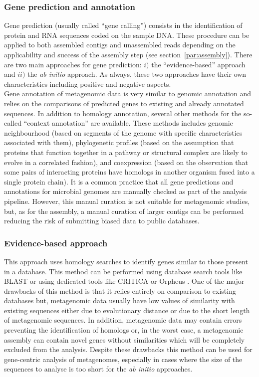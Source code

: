 \subsubsection{Gene prediction and annotation}
Gene prediction (usually called ``gene calling'') consists in the identification of protein and RNA sequences coded on the sample DNA. These procedure can be applied to both assembled contigs and unassembled reads depending on the applicability and success of the assembly step (see section~\ref{par:assembly}). There are two main approaches for gene prediction: $i)$ the ``evidence-based'' approach and $ii)$ the \textit{ab initio} approach. As always, these two approaches have their own characteristics including positive and negative aspects.\\
Gene annotation of metagenomic data is very similar to genomic annotation and relies on the comparisons of predicted genes to existing and already annotated sequences. In addition to homology annotation, several other methods for the so-called ``context annotation'' are available. These methods includes genomic neighbourhood \cite{dandekar1998conservation} (based on segments of the genome with specific characteristics associated with them), phylogenetic profiles \cite{pellegrini1999assigning} (based on the assumption that proteins that function together in a pathway or structural complex are likely to evolve in a correlated fashion), and coexpression \cite{marcotte1999detecting} (based on the observation that some pairs of interacting proteins have homologs in another organism fused into a single protein chain). It is a common practice that all gene predictions and annotations   for microbial genomes are manually checked as part of the analysis pipeline. However, this manual curation is not suitable for metagenomic studies, but, as for the assembly, a manual curation of larger contigs can be performed reducing the risk of submitting biased data to public databases.\\

\subsubsection*{Evidence-based approach}
This approach uses homology searches to identify genes similar to those present in a database. This method can be performed using database search tools like BLAST \cite{altschul1990basic} or using dedicated tools like CRITICA \cite{badger1999critica} or Orpheus \cite{frishman1998combining}. One of the major drawbacks of this method is that it relies entirely on comparison to existing databases but, metagenomic data usually have low values of similarity with existing sequences either due to evolutionary distance or due to the short length of metagenomic sequences. In addition, metagenomic data may contain errors preventing the identification of homologs or, in the worst case, a metagenomic assembly can contain novel genes without similarities which will be completely excluded from the analysis. Despite these drawbacks this method can be used for gene-centric analysis of metagenomes, especially in cases where the size of the sequences to analyse is too short for the \textit{ab initio} approaches.\\

